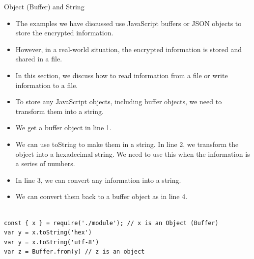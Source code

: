 \begin{frame}[fragile]{Object (Buffer) and String}

\begin{itemize}
	\item The examples we have discussed use JavaScript buffers or JSON objects to store the encrypted information.
	\item However, in a real-world situation, the encrypted information is stored and shared in a file. 
	\item In this section, we discuss how to read information from a file or write information to a file. 
\end{itemize}

\end{frame}

\begin{frame}[fragile]{}

\begin{itemize}
	\item To store any JavaScript objects, including buffer objects, we need to transform them into a string. 
	\item We get a buffer object in line 1. 
	\item We can use toString to make them in a string. In line 2, we transform the object into a hexadecimal string. We need to use this when the information is a series of numbers.
	\item In line 3, we can convert any information into a string.
	\item We can convert them back to a buffer object as in line 4. 
\end{itemize}

\begin{Code}{}%
\begin{lstlisting}[firstnumber=1, label=glabels, xleftmargin=0pt, basicstyle=\tiny]% 

const { x } = require('./module'); // x is an Object (Buffer)
var y = x.toString('hex')
var y = x.toString('utf-8')
var z = Buffer.from(y) // z is an object
\end{lstlisting}%
\end{Code}%

\end{frame}


